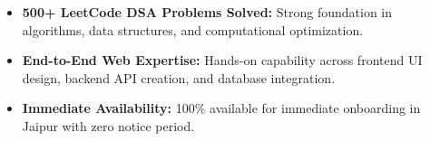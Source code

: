 \documentclass[a4paper,10pt]{article}
\begin{document}
\begin{itemize}

    \item \textbf{500+ LeetCode DSA Problems Solved:} Strong foundation in algorithms, data structures, and computational optimization.

    \item \textbf{End-to-End Web Expertise:} Hands-on capability across frontend UI design, backend API creation, and database integration.

    \item \textbf{Immediate Availability:} 100\% available for immediate onboarding in Jaipur with zero notice period.

\end{itemize}

\end{document}
